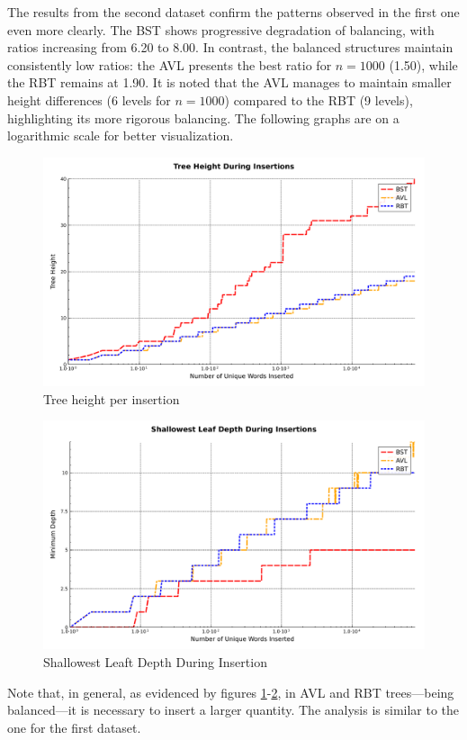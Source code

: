  The results from the second dataset confirm the patterns observed in the first one even more clearly.
 The BST shows progressive degradation of balancing, with ratios increasing from 6.20 to 8.00.
 In contrast, the balanced structures maintain consistently low ratios: the AVL presents the best ratio for $n=1000$ (1.50),
 while the RBT remains at 1.90. It is noted that the AVL manages to maintain smaller height differences (6 levels for $n=1000$)
 compared to the RBT (9 levels), highlighting its more rigorous balancing. The following graphs
 are on a logarithmic scale for better visualization.

 \begin{figure}[H]
     \centering
     \includegraphics[width=0.75\linewidth]{img/Graph_1_77770.pdf}
     \caption{Tree height per insertion}
     \label{fig:maiorgalho2}
 \end{figure}

 \begin{figure}[H]
     \centering
     \includegraphics[width=0.75\linewidth]{img/Graph_2_77770.pdf}
     \caption{Shallowest Leaft Depth During Insertion}
     \label{fig:menorgalho2}
 \end{figure}

 Note that, in general, as evidenced by figures \ref{fig:maiorgalho2}-\ref{fig:menorgalho2}, in AVL and RBT trees—being balanced—it is necessary to insert a larger quantity. The analysis is similar to the one 
 for the first dataset.

 